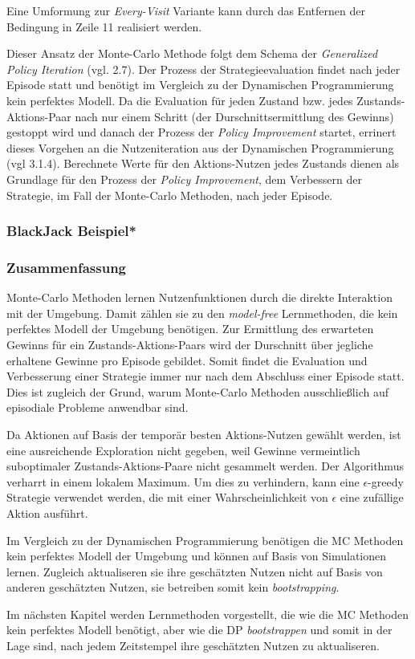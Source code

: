 Eine Umformung zur \textit{Every-Visit} Variante kann durch das Entfernen der Bedingung in Zeile 11 realisiert werden.
\par 
Dieser Ansatz der Monte-Carlo Methode folgt dem Schema der \textit{Generalized Policy Iteration} (vgl. 2.7). Der Prozess der Strategieevaluation findet nach jeder Episode statt und benötigt im Vergleich zu der Dynamischen Programmierung kein perfektes Modell. Da die Evaluation für jeden Zustand bzw. jedes Zustands-Aktions-Paar nach nur einem Schritt (der Durschnittsermittlung des Gewinns) gestoppt wird und danach der Prozess der \textit{Policy Improvement} startet, errinert dieses Vorgehen an die Nutzeniteration aus der Dynamischen Programmierung (vgl 3.1.4).  Berechnete Werte für den Aktions-Nutzen jedes Zustands dienen als Grundlage für den Prozess der \textit{Policy Improvement}, dem Verbessern der Strategie, im Fall der Monte-Carlo Methoden, nach jeder Episode.
\subsubsection{BlackJack Beispiel*}

\subsubsection{Zusammenfassung}
Monte-Carlo Methoden lernen Nutzenfunktionen durch die direkte Interaktion mit der Umgebung. Damit zählen sie zu den \textit{model-free} Lernmethoden, die kein perfektes Modell der Umgebung benötigen. Zur Ermittlung des erwarteten Gewinns für ein Zustands-Aktions-Paars wird der Durschnitt über jegliche erhaltene Gewinne pro Episode gebildet. Somit findet die Evaluation und Verbesserung einer Strategie immer nur nach dem Abschluss einer Episode statt. Dies ist zugleich der Grund, warum Monte-Carlo Methoden ausschließlich auf episodiale Probleme anwendbar sind.
\par 
Da Aktionen auf Basis der temporär besten Aktions-Nutzen gewählt werden, ist eine ausreichende Exploration nicht gegeben, weil Gewinne vermeintlich suboptimaler Zustands-Aktions-Paare nicht gesammelt werden. Der Algorithmus verharrt in einem lokalem Maximum. Um dies zu verhindern, kann eine $\epsilon$-greedy Strategie verwendet werden, die mit einer Wahrscheinlichkeit von $\epsilon$ eine zufällige Aktion ausführt.
\par 
Im Vergleich zu der Dynamischen Programmierung benötigen die MC Methoden kein perfektes Modell der Umgebung und können auf Basis von Simulationen lernen. Zugleich aktualiseren sie ihre geschätzten Nutzen nicht auf Basis von anderen geschätzten Nutzen, sie betreiben somit kein \textit{bootstrapping}. 
\par 
Im nächsten Kapitel werden Lernmethoden vorgestellt, die wie die MC Methoden kein perfektes Modell benötigt, aber wie die DP \textit{bootstrappen} und somit in der Lage sind, nach jedem Zeitstempel ihre geschätzten Nutzen zu aktualiseren.